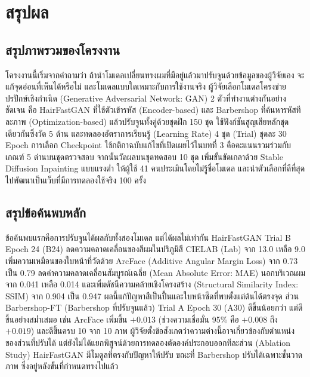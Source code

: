 
\section{สรุปผล}

\subsection{สรุปภาพรวมของโครงงาน}

โครงงานนี้เริ่มจากคำถามว่า ถ้านำโมเดลเปลี่ยนทรงผมที่มีอยู่แล้วมาปรับจูนด้วยข้อมูลของผู้วิจัยเอง
จะแก้จุดอ่อนที่เห็นได้หรือไม่ และโมเดลแบบใดเหมาะกับการใช้งานจริง
ผู้วิจัยเลือกโมเดลโครงข่ายปรปักษ์เชิงกำเนิด (Generative Adversarial Network: GAN) 2 ตัวที่ทำงานต่างกันอย่างชัดเจน
คือ HairFastGAN ที่ใช้ตัวเข้ารหัส (Encoder-based) และ Barbershop ที่ค้นหารหัสทีละภาพ (Optimization-based)
แล้วปรับจูนทั้งคู่ด้วยชุดฝึก 150 ชุด ใช้ฟังก์ชันสูญเสียหลักชุดเดียวกันซึ่งวัด 5 ด้าน
และทดลองอัตราการเรียนรู้ (Learning Rate) 4 ชุด (Trial) ชุดละ 30 Epoch
การเลือก Checkpoint ใช้กติกาฉบับแก้ไขที่เปิดเผยไว้ในบทที่ 3 คือคะแนนรวมร่วมกับเกณฑ์ 5 ด่านบนชุดตรวจสอบ
จากนั้นวัดผลบนชุดทดสอบ 10 ชุด เพิ่มขั้นขัดเกลาด้วย Stable Diffusion Inpainting แบบแรงต่ำ
ให้ผู้ใช้ 41 คนประเมินโดยไม่รู้ชื่อโมเดล และนำตัวเลือกที่ดีที่สุดไปพัฒนาเป็นเว็บที่มีการทดลองใช้จริง 100 ครั้ง

\subsection{สรุปข้อค้นพบหลัก}

ข้อค้นพบแรกคือการปรับจูนได้ผลกับทั้งสองโมเดล แต่ได้ผลไม่เท่ากัน
HairFastGAN Trial B Epoch 24 (B24) ลดความคลาดเคลื่อนของสีผมในปริภูมิสี CIELAB (Lab) จาก 13.0 เหลือ 9.0
เพิ่มความเหมือนของใบหน้าที่วัดด้วย ArcFace (Additive Angular Margin Loss) จาก 0.73 เป็น 0.79
ลดค่าความคลาดเคลื่อนสัมบูรณ์เฉลี่ย (Mean Absolute Error: MAE) นอกบริเวณผมจาก 0.041 เหลือ 0.014
และเพิ่มดัชนีความคล้ายเชิงโครงสร้าง (Structural Similarity Index: SSIM) จาก 0.904 เป็น 0.947
ผลนี้แก้ปัญหาสีเป็นปื้นและใบหน้าซีดที่พบตั้งแต่ต้นได้ตรงจุด
ส่วน Barbershop-FT (Barbershop ที่ปรับจูนแล้ว) Trial A Epoch 30 (A30) ดีขึ้นน้อยกว่า แต่ดีขึ้นอย่างสม่ำเสมอ
เช่น ArcFace เพิ่มขึ้น $+0.013$ (ช่วงความเชื่อมั่น 95\% คือ $+0.008$ ถึง $+0.019$) และดีขึ้นครบ 10 จาก 10 ภาพ
ผู้วิจัยตั้งข้อสังเกตว่าความต่างนี้อาจเกี่ยวข้องกับตำแหน่งของส่วนที่ปรับได้
แต่ยังไม่ได้แยกพิสูจน์ด้วยการทดลองตัดองค์ประกอบออกทีละส่วน (Ablation Study)
HairFastGAN มีโมดูลที่ตรงกับปัญหาให้ปรับ ขณะที่ Barbershop ปรับได้เฉพาะชั้นวาดภาพ ซึ่งอยู่หลังขั้นที่กำหนดทรงไปแล้ว

